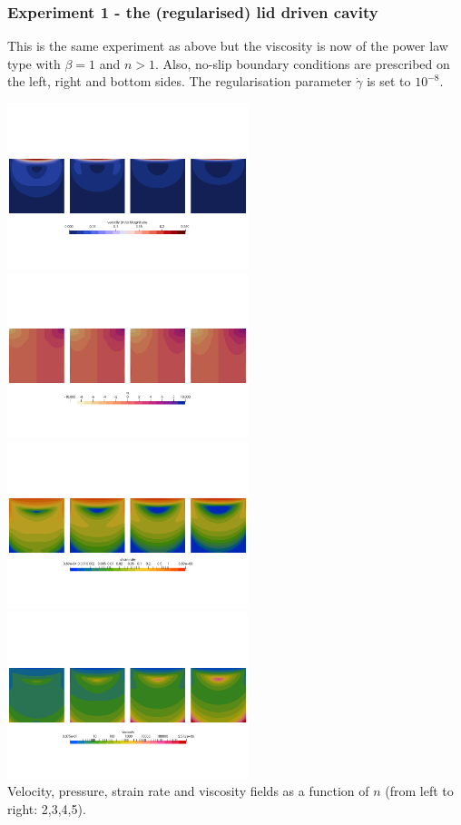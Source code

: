 \subsubsection*{Experiment 1 - the (regularised) lid driven cavity}

This is the same experiment as above but the viscosity is now of the 
power law type with $\beta=1$ and $n>1$. Also, no-slip boundary conditions 
are prescribed on the left, right and bottom sides. 
The regularisation parameter $\dot{\gamma}$ is set to $10^{-8}$.

\begin{center}
\includegraphics[width=7cm]{python_codes/fieldstone_87/results/experiment_01/vel.png}
\includegraphics[width=7cm]{python_codes/fieldstone_87/results/experiment_01/p.png}\\
\includegraphics[width=7cm]{python_codes/fieldstone_87/results/experiment_01/sr.png}
\includegraphics[width=7cm]{python_codes/fieldstone_87/results/experiment_01/eta.png}\\
{\captionfont Velocity, pressure, strain rate and viscosity fields as a function 
of $n$ (from left to right: 2,3,4,5).} 
\end{center}

